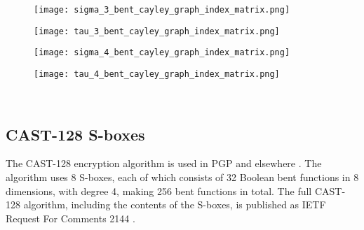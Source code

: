 \begin{figure}[!ht]
\centering
\begin{minipage}{.48\textwidth}
  \centering
  \texttt{[image: sigma\_3\_bent\_cayley\_graph\_index\_matrix.png]}
  \label{fig:sigma_3_bent_cayley_graph_index_matrix}
\end{minipage}%
\begin{minipage}{.48\textwidth}
  \centering
  \texttt{[image: tau\_3\_bent\_cayley\_graph\_index\_matrix.png]}
  \label{fig:tau_3_bent_cayley_graph_index_matrix}
\end{minipage}
\end{figure}

\begin{figure}[!hb]
\centering
\begin{minipage}{.48\textwidth}
  \centering
  \texttt{[image: sigma\_4\_bent\_cayley\_graph\_index\_matrix.png]}
  \label{fig:sigma_4_bent_cayley_graph_index_matrix}
\end{minipage}%
\begin{minipage}{.48\textwidth}
  \centering
  \texttt{[image: tau\_4\_bent\_cayley\_graph\_index\_matrix.png]}
  \label{fig:tau_4_bent_cayley_graph_index_matrix}
\end{minipage}
\end{figure}
~
\newpage
~
\newpage
~
\newpage
\subsection{CAST-128 S-boxes}
%
The CAST-128 encryption algorithm is used in PGP and elsewhere \cite{Ada97}.
The algorithm uses 8 S-boxes, each of which consists of 32 Boolean bent functions in 8 dimensions,
with degree 4, making 256 bent functions in total.
The full CAST-128 algorithm, including the contents of the S-boxes,
is published as IETF Request For Comments 2144 \cite{RFC2144}.


